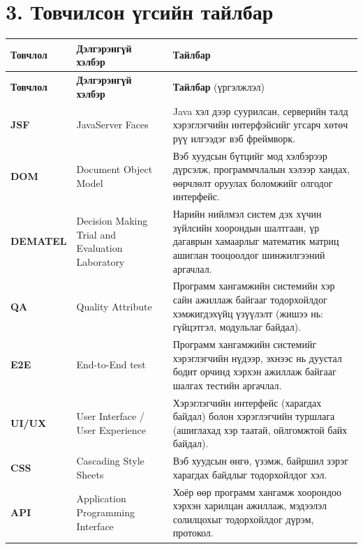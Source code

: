 \section*{3. Товчилсон үгсийн тайлбар}
\renewcommand{\arraystretch}{1}
\begin{longtable}{p{2.5cm} p{4.5cm} p{8cm}}
\toprule
\textbf{Товчлол} & \textbf{Дэлгэрэнгүй хэлбэр} & \textbf{Тайлбар} \\ 
\midrule
\endfirsthead
\toprule
\textbf{Товчлол} & \textbf{Дэлгэрэнгүй хэлбэр} & \textbf{Тайлбар} (үргэлжлэл) \\ 
\midrule
\endhead
\bottomrule
\endfoot

\textbf{JSF} & JavaServer Faces & Java хэл дээр суурилсан, серверийн талд хэрэглэгчийн интерфэйсийг угсарч хөтөч рүү илгээдэг вэб фреймворк. \\ 
\textbf{DOM} & Document Object Model & Вэб хуудсын бүтцийг мод хэлбэрээр дүрсэлж, программчлалын хэлээр хандах, өөрчлөлт оруулах боломжийг олгодог интерфейс. \\ 
\textbf{DEMATEL} & Decision Making Trial and Evaluation Laboratory & Нарийн нийлмэл систем дэх хүчин зүйлсийн хоорондын шалтгаан, үр дагаврын хамаарлыг математик матриц ашиглан тооцоолдог шинжилгээний аргачлал. \\ 
\textbf{QA} & Quality Attribute & Программ хангамжийн системийн хэр сайн ажиллаж байгааг тодорхойлдог хэмжигдэхүйц үзүүлэлт (жишээ нь: гүйцэтгэл, модульлаг байдал). \\ 
\textbf{E2E} & End-to-End test & Программ хангамжийн системийг хэрэглэгчийн нүдээр, эхнээс нь дуустал бодит орчинд хэрхэн ажиллаж байгааг шалгах тестийн аргачлал. \\ 
\textbf{UI/UX} & User Interface / User Experience & Хэрэглэгчийн интерфейс (харагдах байдал) болон хэрэглэгчийн туршлага (ашиглахад хэр таатай, ойлгомжтой байх байдал). \\ 
\textbf{CSS} & Cascading Style Sheets & Вэб хуудсын өнгө, үзэмж, байршил зэрэг харагдах байдлыг тодорхойлдог хэл. \\ 
\textbf{API} & Application Programming Interface & Хоёр өөр программ хангамж хоорондоо хэрхэн харилцан ажиллаж, мэдээлэл солилцохыг тодорхойлдог дүрэм, протокол. \\ 
\end{longtable}

